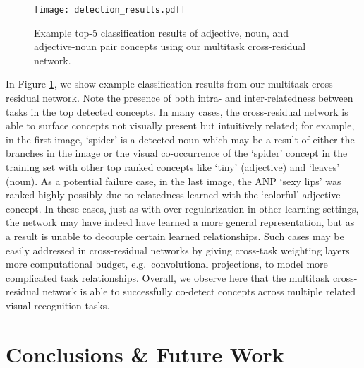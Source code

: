 \documentclass{sig-alternate-05-2015}
\begin{document}
\begin{figure}[t]
  \centering
  \texttt{[image: detection\_results.pdf]} %
  \caption{Example top-5 classification results of adjective, noun, and adjective-noun pair concepts using our multitask cross-residual network.}
  \label{fig:detection_results}
\end{figure}

In Figure \ref{fig:detection_results}, we show example classification results from our multitask cross-residual network.
Note the presence of both intra- and inter-relatedness between tasks in the top detected concepts.
In many cases, the cross-residual network is able to surface concepts not visually present but intuitively related; for example, in the first image, `spider' is a detected noun which may be a result of either the branches in the image or the visual co-occurrence of the `spider' concept in the training set with other top ranked concepts like `tiny' (adjective) and `leaves' (noun).
As a potential failure case, in the last image, the ANP `sexy lips' was ranked highly possibly due to relatedness learned with the `colorful' adjective concept.
In these cases, just as with over regularization in other learning settings, the network may have indeed have learned a more general representation, but as a result is unable to decouple certain learned relationships.
Such cases may be easily addressed in cross-residual networks by giving cross-task weighting layers more computational budget, e.g.~convolutional projections, to model more complicated task relationships.
Overall, we observe here that the multitask cross-residual network is able to successfully co-detect concepts across multiple related visual recognition tasks.


\section{Conclusions \& Future Work}
\label{sec:conclusion}
\end{document}
